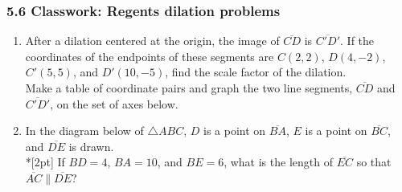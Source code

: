 \documentclass[12pt, twoside]{article}
\begin{document}
\subsubsection*{5.6 Classwork: Regents dilation problems}
 \begin{enumerate}


\item After a dilation centered at the origin, the image of $\overline{CD}$ is $\overline{C'D'}$. If the coordinates of the endpoints of these segments are $C(2,2)$, $D(4,-2)$, $C'(5,5)$, and $D'(10,-5)$, find the scale factor of the dilation.\\[0.25cm]
Make a table of coordinate pairs and graph the two line segments,  $\overline{CD}$ and  $\overline{C'D'}$, on the set of axes below.
  \begin{flushright}
  \end{flushright}


 \item In the diagram below of $\triangle ABC$, $D$ is a point on $\overline{BA}$, $E$ is a point on $\overline{BC}$, and $\overline{DE}$ is drawn. \\*[2pt] 
 If $BD=4$, $BA=10$, and $BE=6$, what is the length of $\overline{EC}$ so that $\overline{AC} \parallel \overline{DE}$?
 
 \begin{flushright}
   \end{flushright}


\newpage


\end{enumerate}
\end{document}

